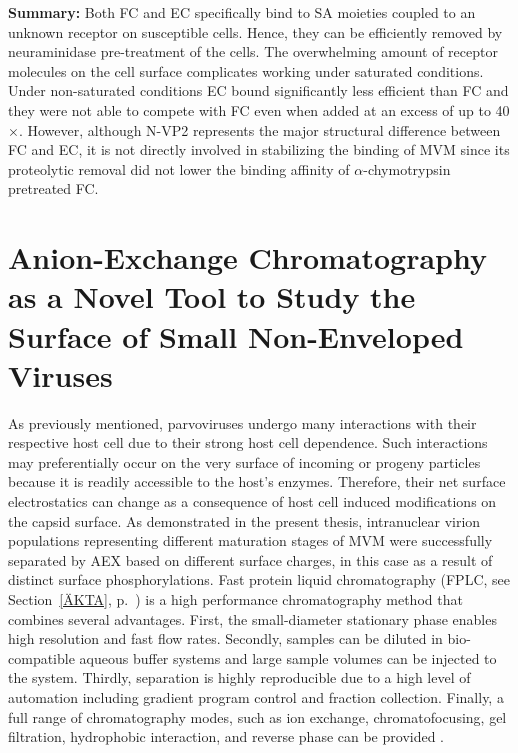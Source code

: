 \medskip
\textbf{Summary:} Both FC and EC specifically bind to SA moieties coupled to an unknown receptor on susceptible cells. Hence, they can be efficiently removed by neuraminidase pre-treatment of the cells. The overwhelming amount of receptor molecules on the cell surface complicates working under saturated conditions. Under non-saturated conditions EC bound significantly less efficient than FC and they were not able to compete with FC even when added at an excess of up to 40$\times$. However, although N-VP2 represents the major structural difference between FC and EC, it is not directly involved in stabilizing the binding of MVM since its proteolytic removal did not lower the binding affinity of $\alpha$-chymotrypsin pretreated FC.   



\section[AEX as a Novel Tool to Study the Surface Conformation of Small Non-Enveloped Viruses]{Anion-Exchange Chromatography as a Novel Tool to Study the Surface of Small Non-Enveloped Viruses}


As previously mentioned, parvoviruses undergo many interactions with their respective host cell due to their strong host cell dependence. Such interactions may preferentially occur on the very surface of incoming or progeny particles because it is readily accessible to the host's enzymes. Therefore, their net surface electrostatics can change as a consequence of host cell induced modifications on the capsid surface. As demonstrated in the present thesis, intranuclear virion populations representing different maturation stages of MVM were successfully separated by AEX based on different surface charges, in this case as a result of distinct surface phosphorylations. Fast protein liquid chromatography (FPLC, see Section~\ref{ÄKTA}, p.~\pageref{ÄKTA}) is a high performance chromatography method that combines several advantages. First, the small-diameter stationary phase enables high resolution and fast flow rates. Secondly, samples can be diluted in bio-compatible aqueous buffer systems and large sample volumes can be injected to the system. Thirdly, separation is highly reproducible due to a high level of automation including gradient program control and fraction collection. Finally, a full range of chromatography modes, such as ion exchange, chromatofocusing, gel filtration, hydrophobic interaction, and reverse phase can be provided \cite{pmid20978981}. 


